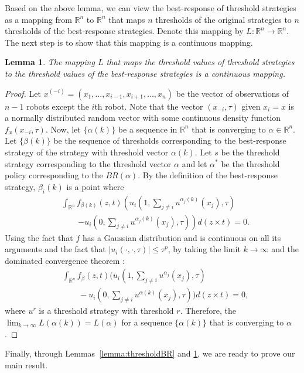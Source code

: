 \documentclass[conference]{ieeeconf}
\newtheorem{lemma}{Lemma}
\def\R{\mathbb{R}}    %
\begin{document}
Based on the above lemma, we can view the best-response of threshold strategies as a mapping from $\R^n$ to $\R^n$ that maps $n$ thresholds of the original strategies to $n$ thresholds of the best-response strategies. Denote this mapping by $L:\R^n\to\R^n$. The next step is to show that this mapping is a continuous mapping. 
\begin{lemma}\label{lemma:continuous}
The mapping $L$ that maps the threshold values of threshold strategies to the threshold values of the best-response strategies is a continuous mapping. 
\end{lemma}
\begin{proof}
Let $x^{(-i)}=(x_1,\ldots,x_{i-1},x_{i+1},\ldots,x_n)$ be the vector of observations of $n-1$ robots except the $i$th robot. Note that the vector $(x_{-i},\tau)$ given $x_i=x$ is a normally distributed random vector with some continuous density function $f_{x}(x_{-i},\tau)$. Now, let $\{\alpha(k)\}$ be a sequence in $\R^n$ that is converging to $\alpha\in\R^n$. Let $\{\beta(k)\}$ be the sequence of thresholds corresponding to the best-response strategy of the strategy with threshold vector $\alpha(k)$. Let $s$ be the threshold strategy corresponding to the threshold vector $\alpha$ and let $\alpha^*$ be the threshold policy corresponding to the $BR(\alpha)$. By the definition of the best-response strategy, $\beta_i(k)$ is a point where 
\begin{align*}
&\int_{\R^{n}}f_{\beta(k)}(z,t)\left(u_i(1,\sum_{j\not=i}u^{\alpha_j(k)}(x_j),\tau)\right.\\
&\qquad\left.-u_i(0,\sum_{j\not=i}u^{\alpha_j(k)}(x_j),\tau)\right)d(z\times t)=0.
\end{align*}
Using the fact that $f$ has a Gaussian distribution and is continuous on all its arguments and the fact that $|u_i(\cdot,\cdot,\tau)|\leq \tau^p$, by taking the limit $k\to\infty$ and the dominated convergence theorem \cite{folland2013real}:
\begin{align*}
&\int_{\R^{n}}f_{\beta}(z,t)(u_i(1,\sum_{j\not=i}u^{\alpha_j}(x_j),\tau)\\ 
&\qquad-u_i(0,\sum_{j\not=i}u^{\alpha(k)}(x_j),\tau))d(z\times t)=0,
\end{align*}
where $u^{r}$ is a threshold strategy with threshold $r$. Therefore, the $\lim_{k\to\infty}L(\alpha(k))=L(\alpha)$ for a sequence $\{\alpha(k)\}$ that is converging to $\alpha$.
\end{proof}
Finally, through Lemmas~\ref{lemma:thresholdBR} and \ref{lemma:continuous}, we are ready to prove our main result. 
\end{document}
